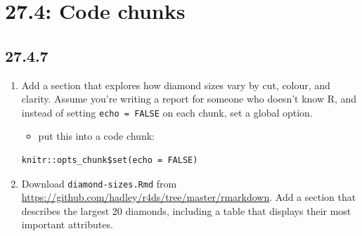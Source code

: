 \documentclass[]{book}
\newenvironment{Shaded}{\begin{snugshade}}{\end{snugshade}}
\newcommand{\DataTypeTok}[1]{\textcolor[rgb]{0.13,0.29,0.53}{#1}}
\newcommand{\DecValTok}[1]{\textcolor[rgb]{0.00,0.00,0.81}{#1}}
\newcommand{\KeywordTok}[1]{\textcolor[rgb]{0.13,0.29,0.53}{\textbf{#1}}}
\newcommand{\NormalTok}[1]{#1}
\newcommand{\OperatorTok}[1]{\textcolor[rgb]{0.81,0.36,0.00}{\textbf{#1}}}
\newcommand{\StringTok}[1]{\textcolor[rgb]{0.31,0.60,0.02}{#1}}
\providecommand{\tightlist}{%
  \setlength{\itemsep}{0pt}\setlength{\parskip}{0pt}}
\theoremstyle{definition}
\theoremstyle{definition}
\theoremstyle{definition}
\theoremstyle{remark}
\begin{document}
\hypertarget{code-chunks}{%
\section{27.4: Code chunks}\label{code-chunks}}

\hypertarget{section-94}{%
\subsection{27.4.7}\label{section-94}}

\begin{enumerate}
\def\labelenumi{\arabic{enumi}.}
\item
  Add a section that explores how diamond sizes vary by cut, colour, and
  clarity. Assume you're writing a report for someone who doesn't know
  R, and instead of setting \texttt{echo\ =\ FALSE} on each chunk, set a
  global option.

  \begin{itemize}
  \tightlist
  \item
    put this into a code chunk:
  \end{itemize}

\begin{verbatim}
knitr::opts_chunk$set(echo = FALSE)
\end{verbatim}
\item
  Download \texttt{diamond-sizes.Rmd} from
  \url{https://github.com/hadley/r4ds/tree/master/rmarkdown}. Add a
  section that describes the largest 20 diamonds, including a table that
  displays their most important attributes.

\begin{Shaded}
\end{Shaded}

  \begin{table}


\end{table}
\end{enumerate}
\end{document}
